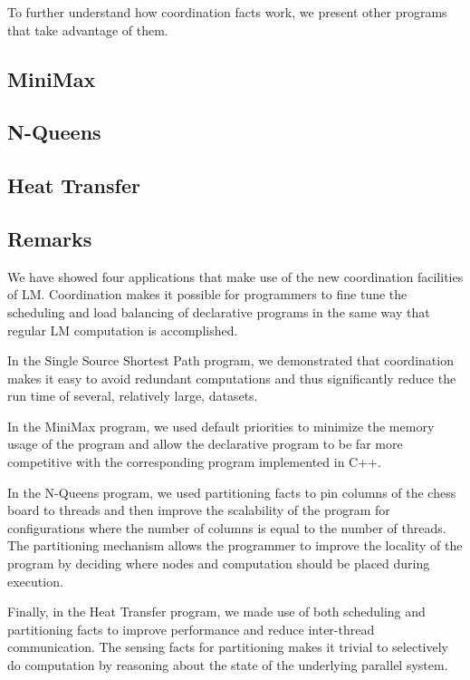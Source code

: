 To further understand how coordination facts work, we present other programs that
take advantage of them.

\subsection{MiniMax}\label{section:coord:minimax}

\subsection{N-Queens}\label{section:coord:nqueens}

\subsection{Heat Transfer}\label{section:coord:ht}


\subsection{Remarks}

We have showed four applications that make use of the new coordination
facilities of LM. Coordination makes it possible for programmers to
fine tune the scheduling and load balancing of declarative programs in
the same way that regular LM computation is accomplished.

In the Single Source Shortest Path program, we demonstrated that coordination
makes it easy to avoid redundant computations and thus significantly reduce the
run time of several, relatively large, datasets.

In the MiniMax program, we used default priorities to minimize the memory usage
of the program and allow the declarative program to be far more competitive
with the corresponding program implemented in C++.

In the N-Queens program, we used partitioning facts to pin columns of the chess
board to threads and then improve the scalability of the program for
configurations where the number of columns is equal to the number of threads.
The partitioning mechanism allows the programmer to improve the locality of the
program by deciding where nodes and computation should be placed during
execution.

Finally, in the Heat Transfer program, we made use of both scheduling and
partitioning facts to improve performance and reduce inter-thread communication.
The sensing facts for partitioning makes it trivial to selectively do
computation by reasoning about the state of the underlying parallel system.
